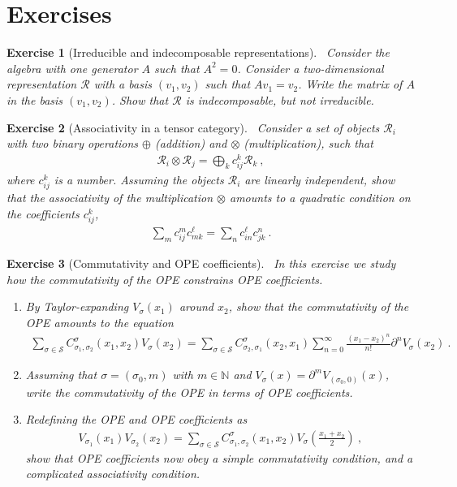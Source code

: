 \documentclass[12pt, a4paper, notitlepage, twoside]{report}
\numberwithin{equation}{section}
\theoremstyle{break}
\newtheorem{exo}{Exercise}[chapter]
\begin{document}
\section{Exercises}


\begin{exo}[Irreducible and indecomposable representations] 
~\label{exoirr}
Consider the algebra with one generator $A$ such that $A^2 = 0$.
Consider a two-dimensional representation $\mathcal{R}$ with a basis $(v_1,v_2)$ such that $Av_1=v_2$.
Write the matrix of $A$ in the basis $(v_1,v_2)$.
Show that $\mathcal{R}$ is indecomposable, but not irreducible. 
\end{exo}

\begin{exo}[Associativity in a tensor category]
 ~\label{exoten}
Consider a set of objects $\mathcal{R}_i$ with two binary operations $\oplus$ (addition) and $\otimes$ (multiplication), such that 
\begin{align}
 \mathcal{R}_i \otimes \mathcal{R}_j = \bigoplus_k c_{ij}^k \mathcal{R}_k\ ,
\end{align}
where $c_{ij}^k$ is a number.
Assuming the objects $\mathcal{R}_i$ are linearly independent, show that the associativity of the multiplication $\otimes$ amounts to a quadratic condition on the coefficients $c_{ij}^k$,
\begin{align}
 \sum_m c_{ij}^m c_{mk}^\ell = \sum_n c_{in}^\ell c_{jk}^n\ .
\end{align}
\end{exo}

\begin{exo}[Commutativity and OPE coefficients]
 ~\label{exocva}
In this exercise we study how the commutativity of the OPE constrains OPE coefficients.
\begin{enumerate}
 \item By Taylor-expanding $V_\sigma(x_1)$ around $x_2$, show that the commutativity of the OPE amounts to the equation
 \begin{align}
  \sum_{\sigma\in \mathcal{S}} C_{\sigma_1,\sigma_2}^{\sigma}(x_1,x_2) V_{\sigma}(x_2) 
  = \sum_{\sigma\in \mathcal{S}} C_{\sigma_2,\sigma_1}^{\sigma}(x_2,x_1)
  \sum_{n=0}^\infty \frac{(x_1-x_2)^n}{n!}\partial^n
  V_{\sigma}(x_2)\ .
 \end{align}
 \item Assuming that $\sigma = (\sigma_0,m)$ with $m\in\mathbb{N}$ and $V_\sigma(x) = \partial^m V_{(\sigma_0,0)}(x)$, write the commutativity of the OPE in terms of OPE coefficients. 
 \item Redefining the OPE and OPE coefficients as 
 \begin{align}
  V_{\sigma_1}(x_1)V_{\sigma_2}(x_2) = \sum_{\sigma\in \mathcal{S}} C_{\sigma_1,\sigma_2}^{\sigma}(x_1,x_2) V_{\sigma}(\tfrac{x_1+x_2}{2})\ ,
 \end{align}
 show that OPE coefficients now obey a simple commutativity condition, and a complicated associativity condition.
\end{enumerate}
\end{exo}
\end{document}
